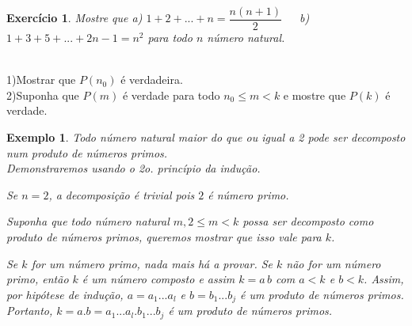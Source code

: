 \documentclass[10pt]{article}
\newtheorem{exemplo}{Exemplo}
\newtheorem{exe}{Exercício}
\begin{document}
\begin{exe}Mostre que a) $1+2+...+n=\dfrac{n(n+1)}{2}$\, \, \, b)$1+3+5+...+2n-1=n^2$ para todo $n$ número natural.
\end{exe}


\\
1)Mostrar que $P(n_0)$ é verdadeira.\\
2)Suponha que $P(m)$ é verdade para todo $n_0\leq m< k$ e mostre que $P(k)$ é verdade.
 \begin{exemplo}
 Todo número natural maior do que ou  igual a 2 pode ser decomposto num produto de números primos.\\
 \noindent Demonstraremos usando o 2o. princípio da indução.

 \noindent Se $n=2$, a decomposição é trivial pois $2$ é número primo.

 \noindent Suponha que todo número natural $m, 2\leq m< k$ possa ser decomposto como produto de números primos, queremos mostrar que isso vale para $k$.

 \noindent Se $k$ for um número primo, nada mais há a provar. Se $k$ não for um número primo, então $k$ é um número composto e assim  $k=a\, b$ com $a< k$ e $b<k$. Assim, por hipótese de indução, $a=a_1...a_l$ e $b=b_1...b_j$ é um produto de números primos. Portanto, $k=a.b=a_1...a_l.b_1...b_j$ é um produto de números primos.
 \end{exemplo}
\end{document}
